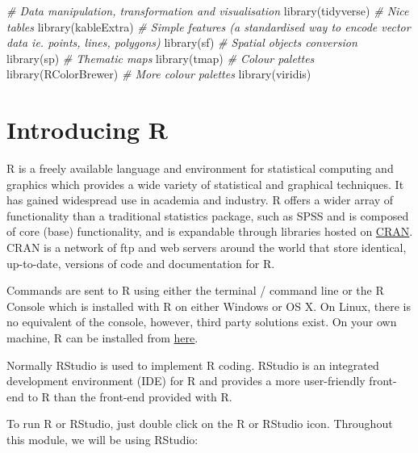 \documentclass[
]{book}
\newenvironment{Shaded}{\begin{snugshade}}{\end{snugshade}}
\newcommand{\CommentTok}[1]{\textcolor[rgb]{0.56,0.35,0.01}{\textit{#1}}}
\newcommand{\FunctionTok}[1]{\textcolor[rgb]{0.00,0.00,0.00}{#1}}
\newcommand{\NormalTok}[1]{#1}
\begin{document}
\begin{Shaded}
\begin{Highlighting}[]
\CommentTok{\# Data manipulation, transformation and visualisation}
\FunctionTok{library}\NormalTok{(tidyverse)}
\CommentTok{\# Nice tables}
\FunctionTok{library}\NormalTok{(kableExtra)}
\CommentTok{\# Simple features (a standardised way to encode vector data ie. points, lines, polygons)}
\FunctionTok{library}\NormalTok{(sf) }
\CommentTok{\# Spatial objects conversion}
\FunctionTok{library}\NormalTok{(sp) }
\CommentTok{\# Thematic maps}
\FunctionTok{library}\NormalTok{(tmap) }
\CommentTok{\# Colour palettes}
\FunctionTok{library}\NormalTok{(RColorBrewer) }
\CommentTok{\# More colour palettes}
\FunctionTok{library}\NormalTok{(viridis)}
\end{Highlighting}
\end{Shaded}

\hypertarget{introducing-r}{%
\section{Introducing R}\label{introducing-r}}

R is a freely available language and environment for statistical computing and graphics which provides a wide variety of statistical and graphical techniques. It has gained widespread use in academia and industry. R offers a wider array of functionality than a traditional statistics package, such as SPSS and is composed of core (base) functionality, and is expandable through libraries hosted on \href{https://cran.r-project.org}{CRAN}. CRAN is a network of ftp and web servers around the world that store identical, up-to-date, versions of code and documentation for R.

Commands are sent to R using either the terminal / command line or the R Console which is installed with R on either Windows or OS X. On Linux, there is no equivalent of the console, however, third party solutions exist. On your own machine, R can be installed from \href{https://www.r-project.org/}{here}.

Normally RStudio is used to implement R coding. RStudio is an integrated development environment (IDE) for R and provides a more user-friendly front-end to R than the front-end provided with R.

To run R or RStudio, just double click on the R or RStudio icon. Throughout this module, we will be using RStudio:
\end{document}
